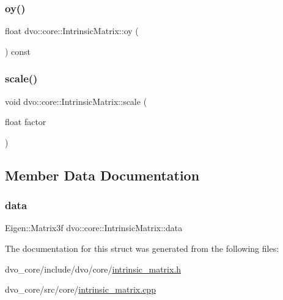 \mbox{\label{structdvo_1_1core_1_1_intrinsic_matrix_ad0d6657452709e25bbcc7bd7b54b5d5b}} 
\subsubsection{\texorpdfstring{oy()}{oy()}}
{\footnotesize\ttfamily float dvo\+::core\+::\+Intrinsic\+Matrix\+::oy (\begin{DoxyParamCaption}{ }\end{DoxyParamCaption}) const}

\mbox{\label{structdvo_1_1core_1_1_intrinsic_matrix_a425932a5bc42fcde9dc768aecd60f7ef}} 
\subsubsection{\texorpdfstring{scale()}{scale()}}
{\footnotesize\ttfamily void dvo\+::core\+::\+Intrinsic\+Matrix\+::scale (\begin{DoxyParamCaption}\item[{float}]{factor }\end{DoxyParamCaption})}



\subsection{Member Data Documentation}
\mbox{\label{structdvo_1_1core_1_1_intrinsic_matrix_ab76264a79c0fce5dbeb590cdbd3d6c46}} 
\subsubsection{\texorpdfstring{data}{data}}
{\footnotesize\ttfamily Eigen\+::\+Matrix3f dvo\+::core\+::\+Intrinsic\+Matrix\+::data}



The documentation for this struct was generated from the following files\+:\begin{DoxyCompactItemize}
\item 
dvo\+\_\+core/include/dvo/core/\mbox{\hyperlink{intrinsic__matrix_8h}{intrinsic\+\_\+matrix.\+h}}\item 
dvo\+\_\+core/src/core/\mbox{\hyperlink{intrinsic__matrix_8cpp}{intrinsic\+\_\+matrix.\+cpp}}\end{DoxyCompactItemize}
